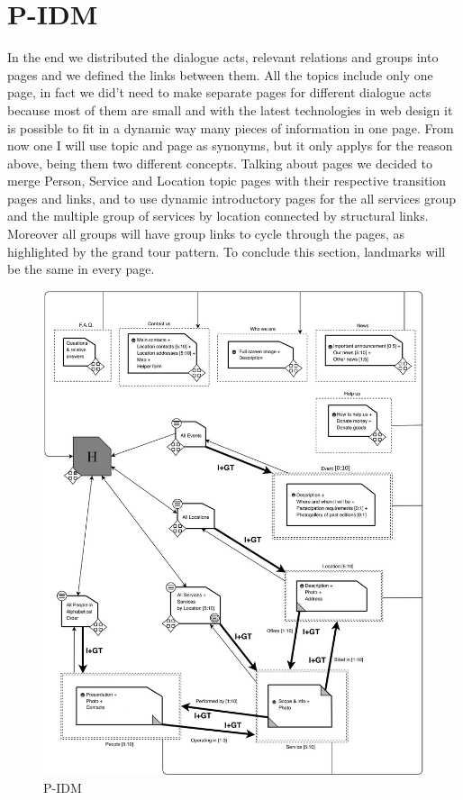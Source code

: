 \section{P-IDM}
%
In the end we distributed the dialogue acts, relevant relations and groups into pages and we defined the links between them. All the topics include only one page, in fact we did't need to make separate pages for different dialogue acts because most of them are small and with the latest technologies in web design it is possible to fit in a dynamic way many pieces of information in one page. From now one I will use topic and page as synonyms, but it only applys for the reason above, being them two different concepts. Talking about pages we decided to merge Person, Service and Location topic pages with their respective transition pages and links, and to use dynamic introductory pages for the all services group and the multiple group of services by location connected by structural links. Moreover all groups will have group links to cycle through the pages, as highlighted by the grand tour pattern. To conclude this section, landmarks will be the same in every page.
\begin{figure}[h]
\includegraphics[width=1.17 \textwidth, center]{MainMatter/images/P-IDM.jpg}
\caption{P-IDM}
\label{fig:figure3}
\end{figure}

